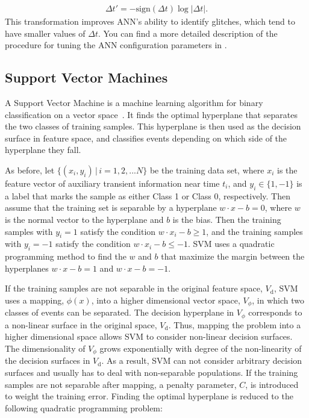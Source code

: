 \documentclass[prd, twocolumn, lengthcheck, superscriptaddress, showpacs, letterpaper, nofootinbib]{revtex4-1}
\newcommand\auxvec{x}
\newcommand\Vdata{V_\mathrm{d}}
\begin{document}
\begin{eqnarray}
	\Delta t'=-\mathrm{sign}(\Delta t)\log|\Delta t|.
\end{eqnarray}
This transformation improves \ac{ANN}'s ability to identify glitches, which tend to have smaller values of $\Delta t$. You can find a more detailed description of the procedure for tuning the \ac{ANN} configuration parameters in \cite{Kim:2012}.

\subsection{Support Vector Machines}
A Support Vector Machine is a machine learning algorithm for binary classification on a vector space~\cite{CortesV:1995,cristianini2000introduction}.
It finds the optimal hyperplane that separates the two classes of training samples. This hyperplane is then used as the decision surface in feature space, and classifies events depending on which side of the hyperplane they fall.

As before, let $ \{(\auxvec_i, y_i) \,|\, i=1, 2, ...N \} $ be the training data set, where $\auxvec_i$ is the feature vector of auxiliary transient information near time $t_i$, and $y_i \in \{1, -1 \} $  is a label that marks the sample as either Class 1 or Class 0, respectively. Then assume that the training set is separable by a hyperplane $w \cdot \auxvec-b=0$, where $w$ is the normal vector to the hyperplane and $b$ is the bias. Then the training samples with $y_i = 1$ satisfy the condition $w \cdot \auxvec_i-b \ge 1$, and the training samples with $y_i = -1$ satisfy the condition $w \cdot \auxvec_i-b \le -1$. \ac{SVM} uses a quadratic  programming method to find the $w$ and $b$ that maximize the margin between the hyperplanes $w \cdot \auxvec-b = 1$ and $w \cdot \auxvec-b = -1$.

If the training samples are not separable in the original feature space, $\Vdata$, \ac{SVM} uses a mapping, $\phi(\auxvec)$, into a higher dimensional vector space, $V_{\phi}$, in which two classes of events can be separated. The decision hyperplane in $V_{\phi}$ corresponds to a non-linear surface in the original space, $\Vdata$. Thus, mapping the problem into a higher dimensional space allows \ac{SVM} to consider non-linear decision surfaces. The dimensionality of $V_{\phi}$ grows exponentially with degree of the non-linearity of the decision surfaces in $\Vdata$. As a result, \ac{SVM} can not consider arbitrary decision surfaces and usually has to deal with non-separable populations. If the training samples are not separable after mapping, a penalty parameter, $C$, is introduced to weight the training error. Finding the optimal hyperplane is reduced to the following quadratic programming problem:
\end{document}
